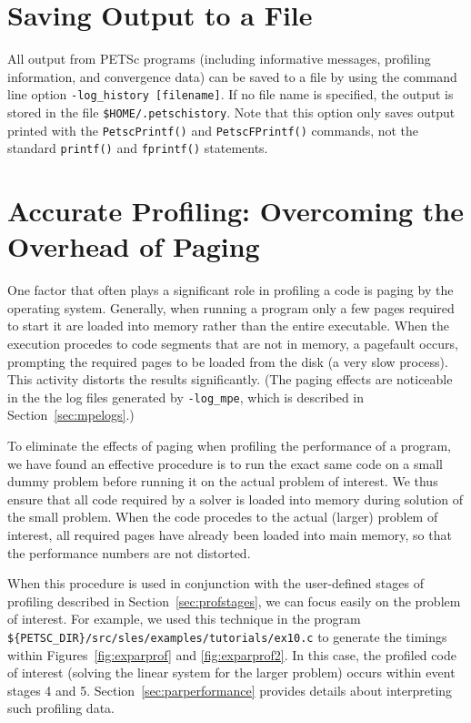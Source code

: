 \section{Saving Output to a File}

All output from PETSc programs (including informative messages, profiling information,
and convergence data) can be saved to a file by using the command line
option {\tt -log\_history [filename]}. 
If no file name is specified, the output is stored in the file {\tt \$HOME/.petschistory}.
 Note that this option only saves output printed with 
the {\tt PetscPrintf()} and {\tt PetscFPrintf()} commands, not the
standard {\tt printf()} and {\tt fprintf()} statements. 
 

\section{Accurate Profiling: Overcoming the Overhead of Paging}
\label{sec:profaccuracy}

One factor that often plays a significant role in profiling a code is
paging by the operating system.  Generally, when running a program
only a few pages required to start it are loaded into memory rather
than the entire executable.  When the execution procedes to code
segments that are not in memory, a pagefault occurs, prompting the
required pages to be loaded from the disk (a very slow process).  This
activity distorts the results significantly. (The paging effects are
noticeable in the the log files generated by {\tt -log\_mpe}, which is
described in Section~\ref{sec:mpelogs}.)

To eliminate the effects of paging when profiling the performance of a
program, we have found an effective procedure is to run the exact same
code on a small dummy problem before running it on the actual problem
of interest. We thus ensure that all code required by a solver is
loaded into memory during solution of the small problem.  When the
code procedes to the actual (larger) problem of interest, all required
pages have already been loaded into main memory, so that the
performance numbers are not distorted.

When this procedure is used in conjunction with the user-defined stages of profiling
described in Section~\ref{sec:profstages}, we can focus easily on the
problem of interest.  For example, we used this technique in the program
{\tt \$\{PETSC\_DIR\}/src/sles/examples/tutorials/ex10.c} to
generate the timings within Figures~\ref{fig:exparprof} and \ref{fig:exparprof2}.
In this case,
the profiled code of interest (solving the linear system for the larger problem)
occurs within event stages 4 and 5.  Section~\ref{sec:parperformance} provides
details about interpreting such profiling data.

